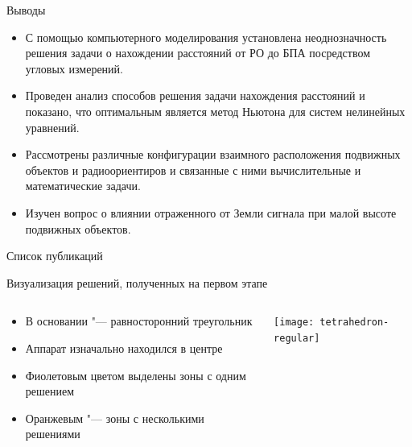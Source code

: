 \documentclass[russian,hyperref={unicode}]{beamer}
\begin{document}
  \begin{frame}{Выводы}
    \begin{itemize}
      \item С помощью компьютерного моделирования установлена неоднозначность решения задачи о нахождении расстояний от РО до БПА посредством угловых измерений.
      \item Проведен анализ способов решения задачи нахождения расстояний и показано, что оптимальным является метод Ньютона для систем нелинейных уравнений.
      \item Рассмотрены различные конфигурации взаимного расположения подвижных объектов и радиоориентиров и связанные с ними вычислительные и математические задачи.
      \item Изучен вопрос о влиянии отраженного от Земли сигнала при малой высоте подвижных объектов.
    \end{itemize}
  \end{frame}

  \begin{frame}[allowframebreaks]{Список публикаций}
    \printbibliography
  \end{frame}

  \frame{\titlepage}

  \appendix
  \begin{frame}{Визуализация решений, полученных на первом этапе}
    \begin{columns}[c]
      \begin{column}{.5\textwidth}
        \begin{itemize}
          \item В основании "--- равносторонний треугольник
          \item Аппарат изначально находился в центре
          \item Фиолетовым цветом выделены зоны с одним решением
          \item Оранжевым "--- зоны с несколькими решениями
        \end{itemize}
      \end{column}
      \begin{column}{.5\textwidth}
        \begin{center}
          \texttt{[image: tetrahedron-regular]}
        \end{center}
      \end{column}
    \end{columns}
  \end{frame}
\end{document}
